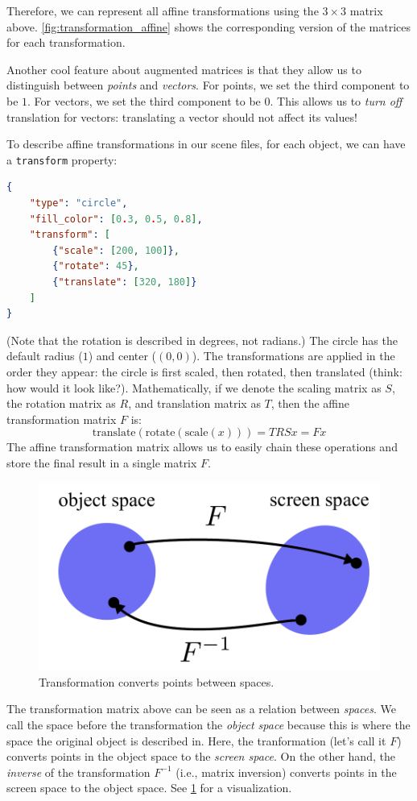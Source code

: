 Therefore, we can represent all affine transformations using the $3 \times 3$ matrix above. \cref{fig:transformation_affine} shows the corresponding version of the matrices for each transformation.

Another cool feature about augmented matrices is that they allow us to distinguish between \emph{points} and \emph{vectors}. For points, we set the third component to be $1$. For vectors, we set the third component to be $0$. This allows us to \emph{turn off} translation for vectors: translating a vector should not affect its values! 

To describe affine transformations in our scene files, for each object, we can have a \lstinline{transform} property:
\begin{lstlisting}[language=json]
{
    "type": "circle",
    "fill_color": [0.3, 0.5, 0.8],
    "transform": [
        {"scale": [200, 100]},
        {"rotate": 45},
        {"translate": [320, 180]}
    ]
}
\end{lstlisting}
(Note that the rotation is described in degrees, not radians.)
The circle has the default radius ($1$) and center ($(0, 0)$). The transformations are applied in the order they appear: the circle is first scaled, then rotated, then translated (think: how would it look like?). Mathematically, if we denote the scaling matrix as $S$, the rotation matrix as $R$, and translation matrix as $T$, then the affine transformation matrix $F$ is:
\begin{equation}
    \text{translate}(\text{rotate}(\text{scale}(x))) = T R S x = F x
\end{equation}
The affine transformation matrix allows us to easily chain these operations and store the final result in a single matrix $F$.

\begin{figure}[ht]
    \centering
    \includegraphics[width=0.5\linewidth]{imgs/spaces.pdf}
    \caption{Transformation converts points between spaces.}
    \label{fig:spaces}
\end{figure}

The transformation matrix above can be seen as a relation between \emph{spaces}. We call the space before the transformation the \emph{object space} because this is where the space the original object is described in. Here, the tranformation (let's call it $F$) converts points in the object space to the \emph{screen space}. On the other hand, the \emph{inverse} of the transformation $F^{-1}$ (i.e., matrix inversion) converts points in the screen space to the object space. See \cref{fig:spaces} for a visualization.

